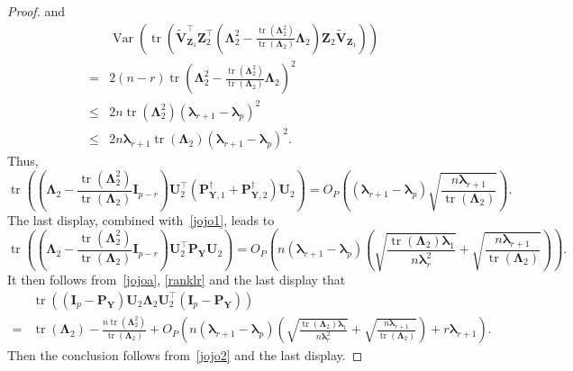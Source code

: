 \documentclass[12pt]{article} %
\DeclareMathOperator{\mytr}{tr}
\DeclareMathOperator{\myVar}{Var}
\newcommand{\bZ}{\mathbf{Z}}
\newcommand{\bP}{\mathbf{P}}
\newcommand{\bY}{\mathbf{Y}}
\newcommand{\bI}{\mathbf{I}}
\newcommand{\bU}{\mathbf{U}}
\newcommand{\bV}{\mathbf{V}}
\newcommand{\bfsym}[1]{\ensuremath{\boldsymbol{#1}}}
\def\blambda {\bfsym {\lambda}}
\def\bLambda {\bfsym {\Lambda}}
\theoremstyle{definition}
\begin{document}
\begin{appendices}
\begin{proof}
       and
       \begin{equation*}
           \begin{split}
    &\myVar\left(
        \mytr\left(\tilde{\bV}_{\bZ_1}^\top \bZ_2^\top 
 \left(
       \bLambda_2^2 
    -\frac{\mytr(\bLambda_2^2)}{\mytr(\bLambda_2)}\bLambda_2
 \right)
\bZ_2 \tilde{\bV}_{\bZ_1}\right)
\right)
\\
=&2(n-r)\mytr
 \left(
       \bLambda_2^2 
    -\frac{\mytr(\bLambda_2^2)}{\mytr(\bLambda_2)}\bLambda_2
\right)^2
\\
\leq & 2n \mytr(\bLambda_2^2) (\blambda_{r+1}-\blambda_p)^2
\\
\leq & 2n \blambda_{r+1}\mytr(\bLambda_2) (\blambda_{r+1}-\blambda_p)^2
.
           \end{split}
       \end{equation*}
       Thus,
       \begin{equation*}
        \mytr\left(
            \left(\bLambda_2-\frac{\mytr(\bLambda_2^2)}{\mytr(\bLambda_2)}\bI_{p-r}\right) \bU_2^\top \left(\bP_{\bY,1}^\dagger+\bP_{\bY,2}^\dagger\right) \bU_2 
    \right)
    =O_P\left((\blambda_{r+1}-\blambda_p)\sqrt{\frac{n\blambda_{r+1}}{\mytr(\bLambda_2)}}\right).
       \end{equation*}
       The last display, combined with~\eqref{jojo1}, leads to
\begin{equation*}
        \mytr\left(
            \left(\bLambda_2-\frac{\mytr(\bLambda_2^2)}{\mytr(\bLambda_2)}\bI_{p-r}\right) \bU_2^\top \bP_{\bY} \bU_2 
    \right)
    =
    O_P\left(n(\blambda_{r+1}-\blambda_p)\left(\sqrt{\frac{\mytr(\bLambda_2)\blambda_1}{n\blambda_r^2}}+\sqrt{\frac{n\blambda_{r+1}}{\mytr(\bLambda_2)}}\right)\right).
\end{equation*}
It then follows from~\eqref{jojoa}, \eqref{ranklr} and the last display that
\begin{equation*}
    \begin{split}
        &\mytr\left(
         (\bI_p -\bP_\bY)\bU_2 \bLambda_2 \bU_2^\top (\bI_p- \bP_{\bY})
    \right)
    \\
    =&\mytr(\bLambda_2)-\frac{n\mytr(\bLambda_2^2)}{\mytr(\bLambda_2)}
    +
    O_P\left(n(\blambda_{r+1}-\blambda_p)\left(\sqrt{\frac{\mytr(\bLambda_2)\blambda_1}{n\blambda_r^2}}+\sqrt{\frac{n\blambda_{r+1}}{\mytr(\bLambda_2)}}\right)
    +r\blambda_{r+1}
    \right).
    \end{split}
\end{equation*}
Then the conclusion follows from~\eqref{jojo2} and the last display.
\end{proof}


\end{appendices}
\end{document}
